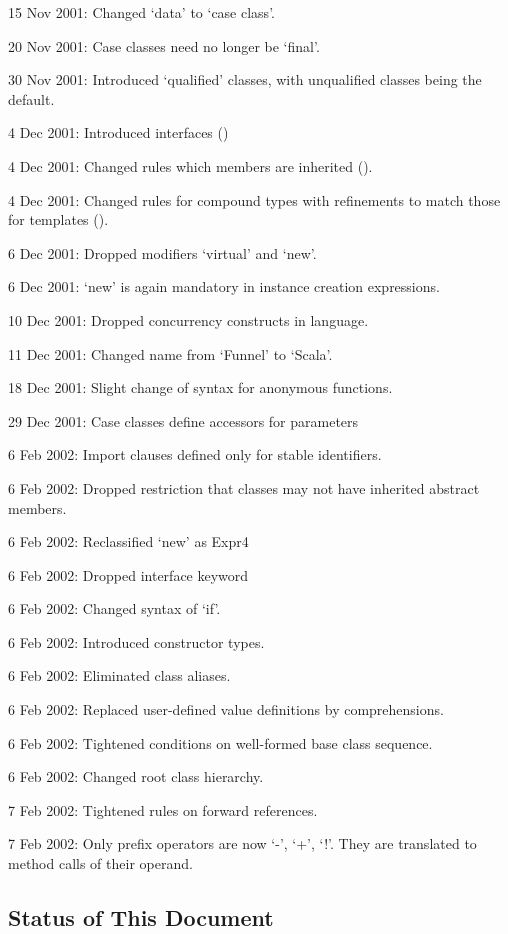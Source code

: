 \documentclass[11pt]{report}
\begin{document}
{15 Nov 2001: Changed `data' to `case class'.

20 Nov 2001: Case classes need no longer be `final'.

30 Nov 2001: Introduced `qualified' classes, with unqualified classes
being the default.

4 Dec 2001: Introduced interfaces ()

4 Dec 2001: Changed rules which members are inherited ().

4 Dec 2001: Changed rules for compound types with refinements to match
those for templates ().

6 Dec 2001: Dropped modifiers `virtual' and `new'.

6 Dec 2001: `new' is again mandatory in instance creation expressions.

10 Dec 2001: Dropped concurrency constructs in language.

11 Dec 2001: Changed name from `Funnel' to `Scala'.

18 Dec 2001: Slight change of syntax for anonymous functions.

29 Dec 2001: Case classes define accessors for parameters

6 Feb 2002: Import clauses defined only for stable identifiers.

6 Feb 2002: Dropped restriction that classes may not have
inherited abstract members.

6 Feb 2002: Reclassified `new' as Expr4

6 Feb 2002: Dropped interface keyword

6 Feb 2002: Changed syntax of `if'.

6 Feb 2002: Introduced constructor types.

6 Feb 2002: Eliminated class aliases.

6 Feb 2002: Replaced user-defined value definitions by comprehensions.

6 Feb 2002: Tightened conditions on well-formed base class sequence.

6 Feb 2002: Changed root class hierarchy.

7 Feb 2002: Tightened rules on forward references.

7 Feb 2002: Only prefix operators are now `-', `+', `!'. They are
translated to method calls of their operand.
}

\subsection*{Status of This Document}
\end{document}
